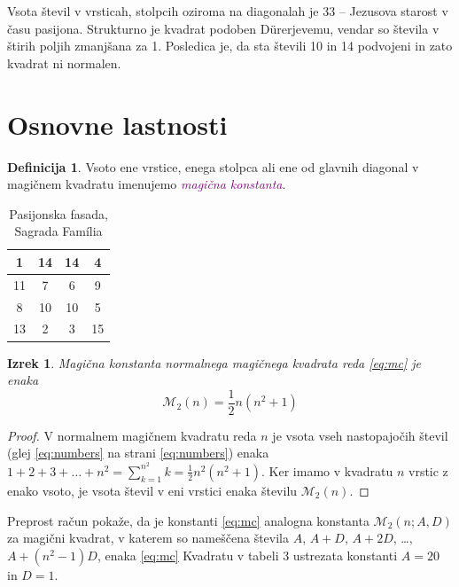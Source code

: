 \documentclass[a4paper,12pt]{article}
\theoremstyle{definition}
\newtheorem{definicija}{Definicija}
\theoremstyle{plain}
\newtheorem{izrek}{Izrek}
\newcommand{\M}{\mathcal{M}}
\newcommand{\pojem}[1]{\textcolor{purple}{\emph{#1}}}
\begin{document}
Vsota števil v vrsticah, stolpcih oziroma na diagonalah je 33 -- Jezusova starost
v času pasijona. Strukturno je kvadrat podoben Dürerjevemu, vendar so števila
v štirih poljih zmanjšana za 1. Posledica je, da sta števili 10 in 14 podvojeni
in zato kvadrat ni normalen.



\section{Osnovne lastnosti}

\begin{definicija}
      Vsoto ene vrstice, enega stolpca ali ene od glavnih diagonal
      v magičnem kvadratu imenujemo \pojem{magična konstanta}.
\end{definicija}

\begin{table}[!ht]
   \centering
   \caption{Pasijonska fasada, Sagrada Família}
   \label{table:sagrada}
   \begin{tabular}{|c|c|c|c|}
       \hline
       1 & 14 & 14 &  4 \\\hline
       11 &  7 &  6 &  9 \\\hline
       8 & 10 & 10 &  5 \\\hline
       13 &  2 &  3 & 15 \\\hline
   \end{tabular}
\end{table}


\begin{izrek}
   Magična konstanta normalnega magičnega kvadrata reda \eqref{eq:mc}
   je enaka
   \begin{equation}
      \label{eq:mc}
      \M_2(n) = \frac{1}{2} n(n^2+1)
   \end{equation}
\end{izrek}

\begin{proof}
   V normalnem magičnem kvadratu reda $n$ je vsota vseh nastopajočih
   števil (glej \eqref{eq:numbers} na strani \eqref{eq:numbers}) enaka
   $1+2+3+\dots+n^2=\sum_{k=1}^{n^2}k=\frac{1}{2}n^2(n^2+1)$. Ker imamo
   v kvadratu $n$ vrstic z enako vsoto, je vsota števil v eni vrstici
   enaka številu $\M_2(n)$. %
\end{proof}

Preprost račun pokaže, da je konstanti \eqref{eq:mc} analogna konstanta
$\M_2(n;A,D)$ za magični kvadrat, v katerem so nameščena števila
$A$, $A+D$, $A+2D$, \dots, $A+(n^2-1)D$, enaka \eqref{eq:mc}
Kvadratu v tabeli 3 ustrezata konstanti $A=20$ in $D=1$.
\end{document}
